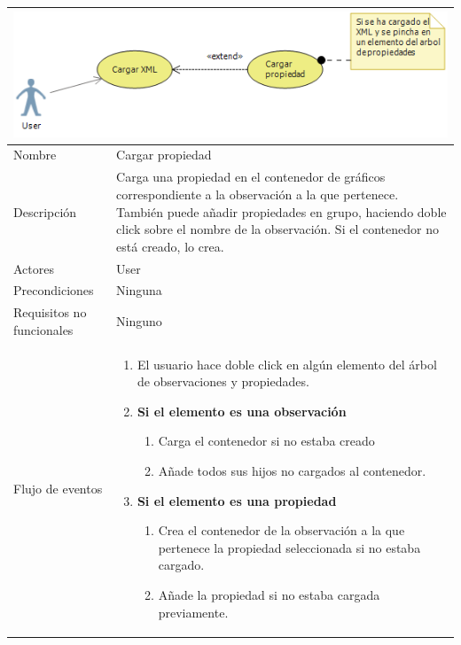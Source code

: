\begin{table}[H]
	\begin{center}
		\begin{tabular}{|l*{1}{p{10cm}}|}
			
			\multicolumn{2}{c}{\includegraphics[width=1.0\linewidth]{./Figures/CargarPropiedad.png}} \\
			\hline
		    Nombre                     & Cargar propiedad \\
		    Descripci\'on              & Carga una propiedad en el contenedor de gr\'aficos
		    							 correspondiente a la observaci\'on a la que pertenece.
		    							 Tambi\'en puede a\~nadir propiedades en grupo, haciendo
		    							 doble click sobre el nombre de la observaci\'on. Si
		    							 el contenedor no est\'a creado, lo crea.  \\ 
		    Actores                    & User  \\
		    Precondiciones             & Ninguna  \\
		    Requisitos no funcionales  & Ninguno  \\
		    Flujo de eventos           & \begin{enumerate}
		    								\item El usuario hace doble click en alg\'un elemento
		    									  del \'arbol de observaciones y propiedades.
		    								\item \textbf{Si el elemento es una observaci\'on}
		    								\begin{enumerate}
		    									\item Carga el contenedor si no estaba creado
		    									\item A\~nade todos sus hijos no cargados al
		    										  contenedor.
		    								\end{enumerate}
		    								\item \textbf{Si el elemento es una propiedad}
		    								\begin{enumerate}
			    								\item Crea el contenedor de la observaci\'on
			    									  a la que pertenece la propiedad seleccionada
			    									  si no estaba cargado.
			    								\item A\~nade la propiedad si no estaba cargada
			    									  previamente.
			    									  

\end{enumerate}
\end{enumerate}
\end{tabular}
\end{center}
\end{table}
